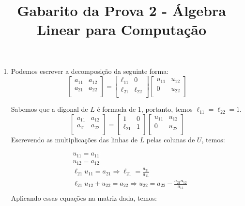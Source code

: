 \documentclass[a4paper,12pt]{article}
\title{Gabarito da Prova 2 - Álgebra Linear para Computação}
\date{}
\begin{document}
\maketitle
\vspace{-4em}
\begin{enumerate}
    \item Podemos escrever a decomposição da seguinte forma:
    $$
    \begin{bmatrix}
        a_{11} & a_{12} \\
        a_{21} & a_{22} \\
    \end{bmatrix}=
    \begin{bmatrix}
        \ell_{11} & 0 \\
        \ell_{21} & \ell_{22} \\
    \end{bmatrix}
    \begin{bmatrix}
        u_{11} & u_{12} \\
        0 & u_{22} \\
    \end{bmatrix}
    $$
    
    Sabemos que a digonal de $L$ é formada de 1, portanto, temos $\ell_{11} = \ell_{22} = 1$.
    $$
    \begin{bmatrix}
        a_{11} & a_{12} \\
        a_{21} & a_{22} \\
    \end{bmatrix}=
    \begin{bmatrix}
        1 & 0 \\
        \ell_{21} & 1 \\
    \end{bmatrix}
    \begin{bmatrix}
        u_{11} & u_{12} \\
        0 & u_{22} \\
    \end{bmatrix}
    $$
    Escrevendo as multiplicações das linhas de $L$ pelas colunas de $U$, temos:
    
    \begin{align*}
        &u_{11} = a_{11}\\
        &u_{12} = a_{12}\\
        &\ell_{21} u_{11} = a_{21} \Rightarrow \ell_{21} = \frac{a_{21}}{a_{11}}\\
        &\ell_{21} u_{12} + u_{22} = a_{22} \Rightarrow u_{22} = a_{22} -  \frac{a_{21} a_{12}}{a_{11}}\\
    \end{align*}
    Aplicando essas equações na matriz dada, temos:


\end{enumerate}
\end{document}

